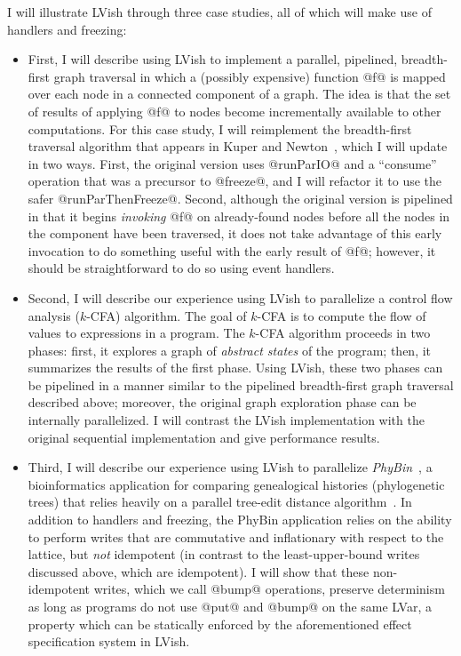 \documentclass{article}
\begin{document}
I will illustrate LVish through three case studies, all of which will
make use of handlers and freezing:
\begin{itemize}
\item First, I will describe using LVish to implement a parallel,
  pipelined, breadth-first graph traversal in which a (possibly
  expensive) function @f@ is mapped over each node in a connected
  component of a graph.  The idea is that the set of results of
  applying @f@ to nodes become incrementally available to other
  computations.  For this case study, I will reimplement the
  breadth-first traversal algorithm that appears in Kuper and
  Newton~\cite{LVars-paper}, which I will update in two ways.  First,
  the original version uses @runParIO@ and a ``consume'' operation
  that was a precursor to @freeze@, and I will refactor it to use the
  safer @runParThenFreeze@.  Second, although the original version is
  pipelined in that it begins \emph{invoking} @f@ on already-found
  nodes before all the nodes in the component have been traversed, it
  does not take advantage of this early invocation to do something
  useful with the early result of @f@; however, it should be
  straightforward to do so using event handlers.
\item Second, I will describe our experience using LVish to
  parallelize a control flow analysis ($k$-CFA) algorithm.  The goal
  of $k$-CFA is to compute the flow of values to expressions in a
  program.  The $k$-CFA algorithm proceeds in two phases: first, it
  explores a graph of \emph{abstract states} of the program; then, it
  summarizes the results of the first phase.  Using LVish, these two
  phases can be pipelined in a manner similar to the pipelined
  breadth-first graph traversal described above; moreover, the
  original graph exploration phase can be internally parallelized.  I
  will contrast the LVish implementation with the original sequential
  implementation and give performance results.
\item Third, I will describe our experience using LVish to parallelize
  \emph{PhyBin}~\cite{PhyBin}, a bioinformatics application for
  comparing genealogical histories (phylogenetic trees) that relies
  heavily on a parallel tree-edit distance algorithm~\cite{hashrf}.
  In addition to handlers and freezing, the PhyBin application relies
  on the ability to perform writes that are commutative and
  inflationary with respect to the lattice, but \emph{not} idempotent
  (in contrast to the least-upper-bound writes discussed above, which
  are idempotent).  I will show that these non-idempotent writes,
  which we call @bump@ operations, preserve determinism as long as
  programs do not use @put@ and @bump@ on the same LVar, a property
  which can be statically enforced by the aforementioned effect
  specification system in LVish.
\end{itemize}
\end{document}
